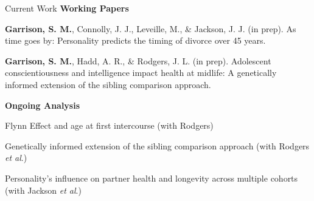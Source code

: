 \documentclass {resume}
\newcommand{\meb}{{\bf Garrison, S. M.}\xspace}
\newcommand{\et}{\textit{et al}.\xspace}
\newlength{\wideitemsep}
\let\olditem\item
\renewcommand{\item}{\setlength{\itemsep}{\wideitemsep}\olditem}
\begin{document}
\begin{rSection}{\textrm{Current Work}}
{\large {\bf Working Papers}}
\begin{etaremune}\item\meb, Connolly, J. J., Leveille, M., \& Jackson, J. J. (in prep). As time goes by: Personality predicts the timing of divorce over 45 years. %
\item\meb, Hadd, A. R., \& Rodgers, J. L. (in prep). Adolescent conscientiousness and intelligence impact health at midlife: A genetically informed extension of the sibling comparison approach. %
\end{etaremune}
{\large {\bf Ongoing Analysis}}\begin{etaremune}
\item Flynn Effect and age at first intercourse (with Rodgers)
\item Genetically informed extension of the sibling comparison approach (with Rodgers \et)
\item Personality's influence on partner health and longevity across multiple cohorts (with Jackson \et)

\end{etaremune}
\end{rSection}
\end{document}
